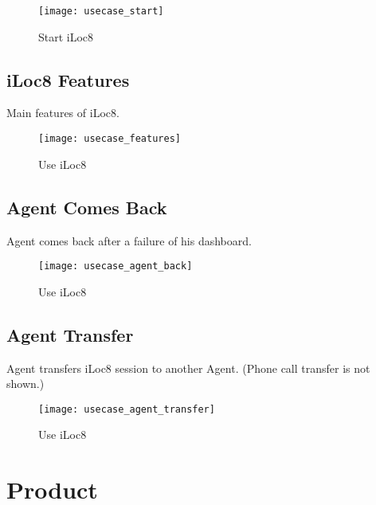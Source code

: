 \documentclass{article}
\begin{document}
	\begin{figure}[htbp]
		\hspace{2cm}
		\texttt{[image: usecase\_start]}
		\caption{Start iLoc8}
		\label{fig:usecase_start}
	\end{figure}

	\newpage
	
	\subsection{iLoc8 Features}
	
	Main features of iLoc8.
	
	\begin{figure}[htbp]
		\hspace{1.5cm}
		\texttt{[image: usecase\_features]}
		\caption{Use iLoc8}
		\label{fig:usecase_features}
	\end{figure}

	\newpage
	
	\subsection{Agent Comes Back}
	
	Agent comes back after a failure of his dashboard.
	
	\begin{figure}[htbp]
		\hspace{2cm}
		\texttt{[image: usecase\_agent\_back]}
		\caption{Use iLoc8}
		\label{fig:usecase_agent_back}
	\end{figure}

	\newpage
	
	\subsection{Agent Transfer}
	
	Agent transfers iLoc8 session to another Agent. (Phone call transfer is not shown.)
	
	\begin{figure}[htbp]
		\hspace{2.5cm}
		\texttt{[image: usecase\_agent\_transfer]}
		\caption{Use iLoc8}
		\label{fig:usecase_agent_transfer}
	\end{figure}

	\newpage

	\section{Product}
	
\end{document}
